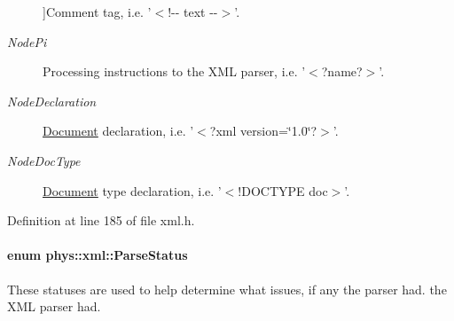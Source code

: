 \begin{Desc}
\begin{description}
{}]Comment tag, i.e. '$<$!-\/-\/ text -\/-\/$>$'. \item[{\em 
\hypertarget{namespacephys_1_1xml_a668b0cc666a9d49f7c7222a7552115d3a3c09d11be0cea840f23f55e084cf72fa}{
NodePi}
\label{d9/d27/namespacephys_1_1xml_a668b0cc666a9d49f7c7222a7552115d3a3c09d11be0cea840f23f55e084cf72fa}
}]Processing instructions to the XML parser, i.e. '$<$?name?$>$'. \item[{\em 
\hypertarget{namespacephys_1_1xml_a668b0cc666a9d49f7c7222a7552115d3a1e3789aa995b7bf563ca8c43553ac035}{
NodeDeclaration}
\label{d9/d27/namespacephys_1_1xml_a668b0cc666a9d49f7c7222a7552115d3a1e3789aa995b7bf563ca8c43553ac035}
}]\hyperlink{classphys_1_1xml_1_1Document}{Document} declaration, i.e. '$<$?xml version=\char`\"{}1.0\char`\"{}?$>$'. \item[{\em 
\hypertarget{namespacephys_1_1xml_a668b0cc666a9d49f7c7222a7552115d3aca750034b7e4a34d53cfd3399b2bcd99}{
NodeDocType}
\label{d9/d27/namespacephys_1_1xml_a668b0cc666a9d49f7c7222a7552115d3aca750034b7e4a34d53cfd3399b2bcd99}
}]\hyperlink{classphys_1_1xml_1_1Document}{Document} type declaration, i.e. '$<$!DOCTYPE doc$>$'. \end{description}
\end{Desc}



Definition at line 185 of file xml.h.

\hypertarget{namespacephys_1_1xml_ae7aabb879b21c73d8183a54470f8917f}{
\paragraph[{ParseStatus}]{\setlength{\rightskip}{0pt plus 5cm}enum {\bf phys::xml::ParseStatus}}\hfill}
\label{d9/d27/namespacephys_1_1xml_ae7aabb879b21c73d8183a54470f8917f}


These statuses are used to help determine what issues, if any the parser had. the XML parser had. 

